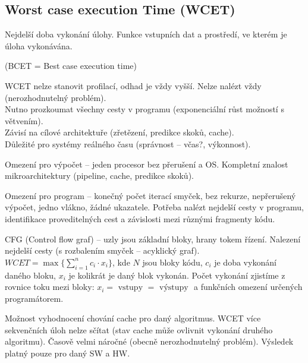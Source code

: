 \documentclass[a4paper, 11pt]{report}
\begin{document}
\subsection{Worst case execution Time (WCET)}
Nejdelší doba vykonání úlohy. Funkce vstupních dat a prostředí, ve kterém je úloha vykonávána.

(BCET = Best case execution time)

WCET nelze stanovit profilací, odhad je vždy vyšší. Nelze nalézt vždy (nerozhodnutelný problém).\\
Nutno prozkoumat všechny cesty v programu (exponenciální růst možností s větvením).\\
Závisí na cílové architektuře (zřetězení, predikce skoků, cache).\\
Důležité pro systémy reálného času (správnost -- včas?, výkonnost).

Omezení pro výpočet -- jeden procesor bez přerušení a OS. Kompletní znalost mikroarchitektury (pipeline, cache, predikce skoků).

Omezení pro program -- konečný počet iterací smyček, bez rekurze, nepřerušený výpočet, jedno vlákno, žádné ukazatele. Potřeba nalézt nejdelší cesty v programu, identifikace proveditelných cest a závislosti mezi různými fragmenty kódu.

CFG (Control flow graf) -- uzly jsou základní bloky, hrany tokem řízení. Nalezení nejdelší cesty (s rozbalením smyček -- acyklický graf). $WCET = \max\{\sum_{i=1}^n c_i \cdot x_i\}$, kde $N$ jsou bloky kódu, $c_i$ je doba vykonání daného bloku, $x_i$ je kolikrát je daný blok vykonán. Počet vykonání zjistíme z rovnice toku mezi bloky: $x_i = \text{ vstupy } = \text{ výstupy }$ a funkčních omezení určených programátorem.

Možnost vyhodnocení chování cache pro daný algoritmus. WCET více sekvenčních úloh nelze sčítat (stav cache může ovlivnit vykonání druhého algoritmu). Časově velmi náročné (obecně nerozhodnutelný problém). Výsledek platný pouze pro daný SW a HW.
\end{document}
